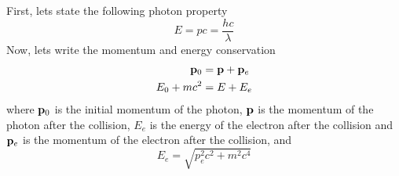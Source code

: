 \documentclass[oneside, 10pt, notitlepage]{book}
\begin{document}
First, lets state the following photon property
\begin{equation}
    E = p c = \frac{hc}{\lambda}
\end{equation}
Now, lets write the momentum and energy conservation
\begin{equation}
\begin{split}
    \vb{p}_0 &= \vb{p}+\vb{p}_e \\
    E_0 + m c^2 &= E + E_e
\end{split}
\end{equation}
where \(\vb{p}_0\) is the initial momentum of the photon, \(\vb{p}\) is the momentum of the photon after the collision, \(E_e\) is the energy of the electron after the collision and \(\vb{p}_e\) is the momentum of the electron after the collision, and 
\begin{equation}
    E_e = \sqrt{p_e^2 c^2 + m^2 c^4}
\end{equation}
\end{document}
